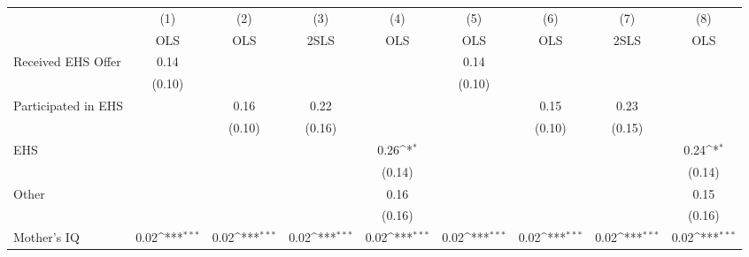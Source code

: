 {
\def\sym#1{\ifmmode^{#1}\else\(^{#1}\)\fi}
\begin{tabular}{l*{8}{c}}
\hline\hline
                    &\multicolumn{1}{c}{(1)}&\multicolumn{1}{c}{(2)}&\multicolumn{1}{c}{(3)}&\multicolumn{1}{c}{(4)}&\multicolumn{1}{c}{(5)}&\multicolumn{1}{c}{(6)}&\multicolumn{1}{c}{(7)}&\multicolumn{1}{c}{(8)}\\
                    &\multicolumn{1}{c}{OLS}&\multicolumn{1}{c}{OLS}&\multicolumn{1}{c}{2SLS}&\multicolumn{1}{c}{OLS}&\multicolumn{1}{c}{OLS}&\multicolumn{1}{c}{OLS}&\multicolumn{1}{c}{2SLS}&\multicolumn{1}{c}{OLS}\\
\hline
Received EHS Offer  &        0.14         &                     &                     &                     &        0.14         &                     &                     &                     \\
                    &      (0.10)         &                     &                     &                     &      (0.10)         &                     &                     &                     \\
[1em]
Participated in EHS &                     &        0.16         &        0.22         &                     &                     &        0.15         &        0.23         &                     \\
                    &                     &      (0.10)         &      (0.16)         &                     &                     &      (0.10)         &      (0.15)         &                     \\
[1em]
EHS                 &                     &                     &                     &        0.26\sym{*}  &                     &                     &                     &        0.24\sym{*}  \\
                    &                     &                     &                     &      (0.14)         &                     &                     &                     &      (0.14)         \\
[1em]
Other               &                     &                     &                     &        0.16         &                     &                     &                     &        0.15         \\
                    &                     &                     &                     &      (0.16)         &                     &                     &                     &      (0.16)         \\
[1em]
Mother's IQ         &        0.02\sym{***}&        0.02\sym{***}&        0.02\sym{***}&        0.02\sym{***}&        0.02\sym{***}&        0.02\sym{***}&        0.02\sym{***}&        0.02\sym{***}\\

\end{tabular}}
